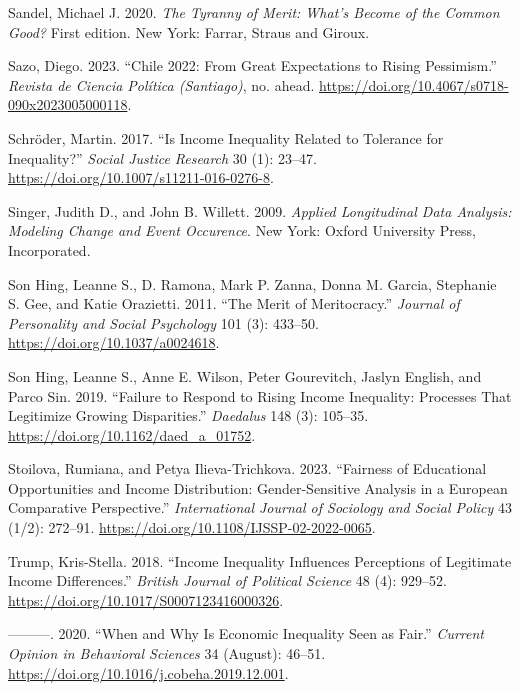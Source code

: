 \documentclass[
]{article}
\newlength{\cslhangindent}
\newenvironment{CSLReferences}[2] %
 {\begin{list}{}{%
  \setlength{\itemindent}{0pt}
  \setlength{\leftmargin}{0pt}
  \setlength{\parsep}{0pt}
  \ifodd #1
   \setlength{\leftmargin}{\cslhangindent}
   \setlength{\itemindent}{-1\cslhangindent}
  \fi
  \setlength{\itemsep}{#2\baselineskip}}}
 {\end{list}}
\begin{document}
\begin{CSLReferences}{1}{0}
Sandel, Michael J. 2020. \emph{The Tyranny of Merit: {What}'s Become of
the Common Good?} First edition. New York: {Farrar, Straus and Giroux}.

Sazo, Diego. 2023. {``Chile 2022: {From} Great Expectations to Rising
Pessimism.''} \emph{Revista de Ciencia Pol{í}tica (Santiago)}, no.
ahead. \url{https://doi.org/10.4067/s0718-090x2023005000118}.

Schröder, Martin. 2017. {``Is {Income Inequality Related} to {Tolerance}
for {Inequality}?''} \emph{Social Justice Research} 30 (1): 23--47.
\url{https://doi.org/10.1007/s11211-016-0276-8}.

Singer, Judith D., and John B. Willett. 2009. \emph{Applied Longitudinal
Data Analysis: Modeling Change and Event Occurence}. New York: Oxford
University Press, Incorporated.

Son Hing, Leanne S., D. Ramona, Mark P. Zanna, Donna M. Garcia,
Stephanie S. Gee, and Katie Orazietti. 2011. {``The Merit of
Meritocracy.''} \emph{Journal of Personality and Social Psychology} 101
(3): 433--50. \url{https://doi.org/10.1037/a0024618}.

Son Hing, Leanne S., Anne E. Wilson, Peter Gourevitch, Jaslyn English,
and Parco Sin. 2019. {``Failure to {Respond} to {Rising Income
Inequality}: {Processes That Legitimize Growing Disparities}.''}
\emph{Daedalus} 148 (3): 105--35.
\url{https://doi.org/10.1162/daed_a_01752}.

Stoilova, Rumiana, and Petya Ilieva-Trichkova. 2023. {``Fairness of
Educational Opportunities and Income Distribution: Gender-Sensitive
Analysis in a {European} Comparative Perspective.''} \emph{International
Journal of Sociology and Social Policy} 43 (1/2): 272--91.
\url{https://doi.org/10.1108/IJSSP-02-2022-0065}.

Trump, Kris-Stella. 2018. {``Income {Inequality Influences Perceptions}
of {Legitimate Income Differences}.''} \emph{British Journal of
Political Science} 48 (4): 929--52.
\url{https://doi.org/10.1017/S0007123416000326}.

---------. 2020. {``When and Why Is Economic Inequality Seen as Fair.''}
\emph{Current Opinion in Behavioral Sciences} 34 (August): 46--51.
\url{https://doi.org/10.1016/j.cobeha.2019.12.001}.


\end{CSLReferences}
\end{document}

